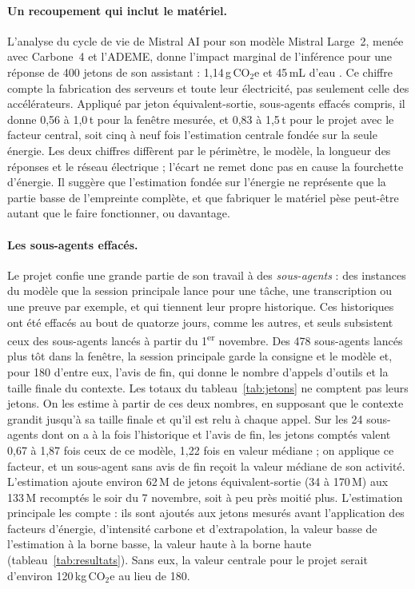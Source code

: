 \documentclass[11pt,a4paper]{article}
\begin{document}
\paragraph{Un recoupement qui inclut le matériel.} L'analyse du cycle de vie de Mistral AI pour son modèle Mistral Large~2, menée avec Carbone~4 et l'ADEME, donne l'impact marginal de l'inférence pour une réponse de 400 jetons de son assistant : 1,14\,g\,CO$_2$e et 45\,mL d'eau \citep{mistral2025}. Ce chiffre compte la fabrication des serveurs et toute leur électricité, pas seulement celle des accélérateurs. Appliqué par jeton équivalent-sortie, sous-agents effacés compris, il donne 0,56 à 1,0\,t pour la fenêtre mesurée, et 0,83 à 1,5\,t pour le projet avec le facteur central, soit cinq à neuf fois l'estimation centrale fondée sur la seule énergie. Les deux chiffres diffèrent par le périmètre, le modèle, la longueur des réponses et le réseau électrique ; l'écart ne remet donc pas en cause la fourchette d'énergie. Il suggère que l'estimation fondée sur l'énergie ne représente que la partie basse de l'empreinte complète, et que fabriquer le matériel pèse peut-être autant que le faire fonctionner, ou davantage.

\paragraph{Les sous-agents effacés.} Le projet confie une grande partie de son travail à des \emph{sous-agents} : des instances du modèle que la session principale lance pour une tâche, une transcription ou une preuve par exemple, et qui tiennent leur propre historique. Ces historiques ont été effacés au bout de quatorze jours, comme les autres, et seuls subsistent ceux des sous-agents lancés à partir du 1\textsuperscript{er} novembre. Des 478 sous-agents lancés plus tôt dans la fenêtre, la session principale garde la consigne et le modèle et, pour 180 d'entre eux, l'avis de fin, qui donne le nombre d'appels d'outils et la taille finale du contexte. Les totaux du tableau~\ref{tab:jetons} ne comptent pas leurs jetons. On les estime à partir de ces deux nombres, en supposant que le contexte grandit jusqu'à sa taille finale et qu'il est relu à chaque appel. Sur les 24 sous-agents dont on a à la fois l'historique et l'avis de fin, les jetons comptés valent 0,67 à 1,87 fois ceux de ce modèle, 1,22 fois en valeur médiane ; on applique ce facteur, et un sous-agent sans avis de fin reçoit la valeur médiane de son activité. L'estimation ajoute environ 62\,M de jetons équivalent-sortie (34 à 170\,M) aux 133\,M recomptés le soir du 7 novembre, soit à peu près moitié plus. L'estimation principale les compte : ils sont ajoutés aux jetons mesurés avant l'application des facteurs d'énergie, d'intensité carbone et d'extrapolation, la valeur basse de l'estimation à la borne basse, la valeur haute à la borne haute (tableau~\ref{tab:resultats}). Sans eux, la valeur centrale pour le projet serait d'environ 120\,kg\,CO$_2$e au lieu de 180.
\end{document}
